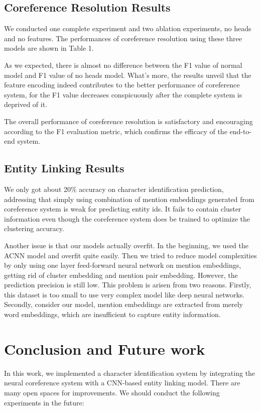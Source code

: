 \documentclass[11pt]{article}
\begin{document}
\subsection{Coreference Resolution Results}
We conducted one complete experiment and two ablation experiments, no heads and no features. The performances of coreference resolution using these three models are shown in Table 1. 

As we expected, there is almost no difference between the F1 value of normal model and F1 value of no heads model. What's more, the results unveil that the feature encoding indeed contributes to the better performance of coreference system, for the F1 value decreases conspicuously after the complete system is deprived of it.  

The overall performance of coreference resolution is satisfactory and encouraging according to the F1 evaluation metric, which confirms the efficacy of the end-to-end system.

\subsection{Entity Linking Results}
We only got about 20\% accuracy on character identification prediction, addressing that simply using combination of mention embeddings generated from coreference system is weak for predicting entity ids. It fails to contain cluster information even though the coreference system does be trained to optimize the clustering accuracy. 

Another issue is that our models actually overfit. In the beginning, we used the ACNN model and overfit quite easily. Then we tried to reduce model complexities by only using one layer feed-forward neural network on mention embeddings, getting rid of cluster embedding and mention pair embedding. However, the prediction precision is still low. This problem is arisen from two reasons. Firstly, this dataset is too small to use very complex model like deep neural networks. Secondly, consider our model, mention embeddings are extracted from merely word embeddings, which are insufficient to capture entity information.

\section{Conclusion and Future work}

In this work, we implemented a character identification system by integrating the neural coreference system with a CNN-based entity linking model. There are many open spaces for improvements. We should conduct the following experiments in the future:
\end{document}
